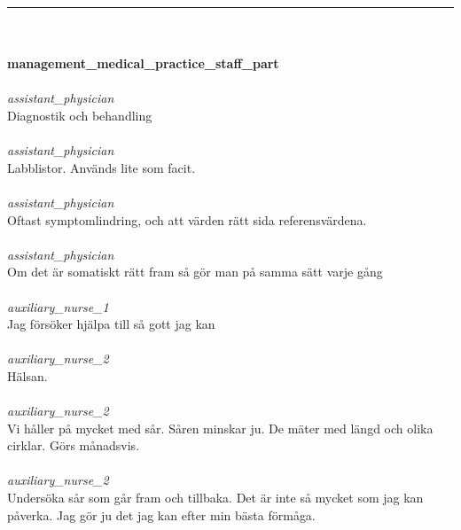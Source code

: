 \documentclass[12pt,a4paper,oneside]{article}
\begin{document}
\hrule
\ \\\ \\{\bf management\_medical\_practice\_staff\_part }
\\\ \\%
 { \it assistant\_physician %
}\\
Diagnostik och behandling %
\ \\\ \\
 { \it   assistant\_physician %
}\\
Labblistor. Anv{\"a}nds lite som facit. %
\ \\\ \\
 { \it   assistant\_physician %
}\\
Oftast symptomlindring, och att v{\"a}rden r{\"a}tt sida referensv{\"a}rdena.  %
\ \\\ \\
 { \it   assistant\_physician %
}\\
Om det {\"a}r somatiskt r{\"a}tt fram s{\aa} g{\"o}r man p{\aa} samma s{\"a}tt varje g{\aa}ng %
\ \\\ \\
 { \it   auxiliary\_nurse\_1 %
}\\
Jag f{\"o}rs{\"o}ker hj{\"a}lpa till s{\aa} gott jag kan %
\ \\\ \\
 { \it   auxiliary\_nurse\_2 %
}\\
H{\"a}lsan.  %
\ \\\ \\
 { \it   auxiliary\_nurse\_2 %
}\\
Vi h{\aa}ller p{\aa} mycket med s{\aa}r. S{\aa}ren minskar ju. De m{\"a}ter med l{\"a}ngd och olika cirklar. G{\"o}rs m{\aa}nadsvis. %
\ \\\ \\
 { \it   auxiliary\_nurse\_2 %
}\\
Unders{\"o}ka s{\aa}r som g{\aa}r fram och tillbaka. Det {\"a}r inte s{\aa} mycket som jag kan p{\aa}verka. Jag g{\"o}r ju det jag kan efter min b{\"a}sta f{\"o}rm{\aa}ga. %
\end{document}
